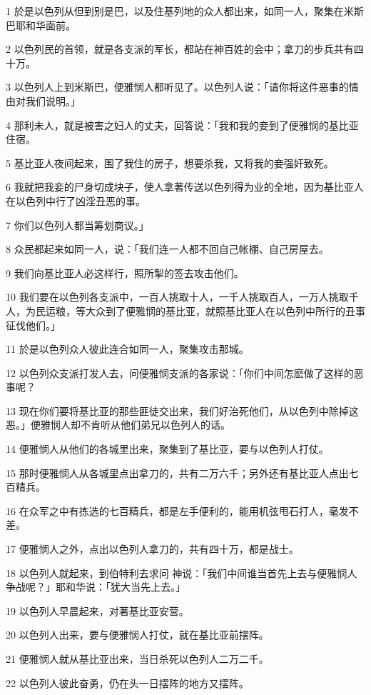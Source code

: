 \par 1 於是以色列从但到别是巴，以及住基列地的众人都出来，如同一人，聚集在米斯巴耶和华面前。
\par 2 以色列民的首领，就是各支派的军长，都站在神百姓的会中；拿刀的步兵共有四十万。
\par 3 以色列人上到米斯巴，便雅悯人都听见了。以色列人说：「请你将这件恶事的情由对我们说明。」
\par 4 那利未人，就是被害之妇人的丈夫，回答说：「我和我的妾到了便雅悯的基比亚住宿。
\par 5 基比亚人夜间起来，围了我住的房子，想要杀我，又将我的妾强奸致死。
\par 6 我就把我妾的尸身切成块子，使人拿著传送以色列得为业的全地，因为基比亚人在以色列中行了凶淫丑恶的事。
\par 7 你们以色列人都当筹划商议。」
\par 8 众民都起来如同一人，说：「我们连一人都不回自己帐棚、自己房屋去。
\par 9 我们向基比亚人必这样行，照所掣的签去攻击他们。
\par 10 我们要在以色列各支派中，一百人挑取十人，一千人挑取百人，一万人挑取千人，为民运粮，等大众到了便雅悯的基比亚，就照基比亚人在以色列中所行的丑事征伐他们。」
\par 11 於是以色列众人彼此连合如同一人，聚集攻击那城。
\par 12 以色列众支派打发人去，问便雅悯支派的各家说：「你们中间怎麽做了这样的恶事呢？
\par 13 现在你们要将基比亚的那些匪徒交出来，我们好治死他们，从以色列中除掉这恶。」便雅悯人却不肯听从他们弟兄以色列人的话。
\par 14 便雅悯人从他们的各城里出来，聚集到了基比亚，要与以色列人打仗。
\par 15 那时便雅悯人从各城里点出拿刀的，共有二万六千；另外还有基比亚人点出七百精兵。
\par 16 在众军之中有拣选的七百精兵，都是左手便利的，能用机弦甩石打人，毫发不差。
\par 17 便雅悯人之外，点出以色列人拿刀的，共有四十万，都是战士。
\par 18 以色列人就起来，到伯特利去求问 神说：「我们中间谁当首先上去与便雅悯人争战呢？」耶和华说：「犹大当先上去。」
\par 19 以色列人早晨起来，对著基比亚安营。
\par 20 以色列人出来，要与便雅悯人打仗，就在基比亚前摆阵。
\par 21 便雅悯人就从基比亚出来，当日杀死以色列人二万二千。
\par 22 以色列人彼此奋勇，仍在头一日摆阵的地方又摆阵。
